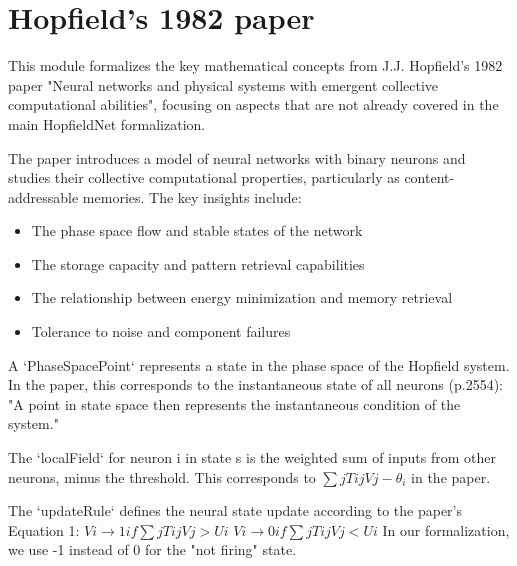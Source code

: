 \chapter{Hopfield's 1982 paper}

This module formalizes the key mathematical concepts from J.J. Hopfield's 1982 paper \cite{hopfield1982neural}
"Neural networks and physical systems with emergent collective computational abilities",
focusing on aspects that are not already covered in the main HopfieldNet formalization.

The paper introduces a model of neural networks with binary neurons and studies their collective
computational properties, particularly as content-addressable memories. The key insights include:

\begin{itemize}
\item The phase space flow and stable states of the network
\item The storage capacity and pattern retrieval capabilities
\item The relationship between energy minimization and memory retrieval
\item Tolerance to noise and component failures
\end{itemize}

\begin{definition}\label{PhaseSpacePoint}
\leanok
A `PhaseSpacePoint` represents a state in the phase space of the Hopfield system.
In the paper, this corresponds to the instantaneous state of all neurons (p.2554):
"A point in state space then represents the instantaneous condition of the system."
\end{definition}


\begin{definition}\label{localField}
\leanok
The `localField` for neuron i in state s is the weighted sum of inputs from other neurons,
minus the threshold. This corresponds to $\sum j Tij Vj - \theta_i$ in the paper.
\end{definition}


\begin{definition}\label{updateRule}
\leanok
The `updateRule` defines the neural state update according to the paper's Equation 1:
    $Vi \rightarrow 1 if \sum j Tij Vj > Ui$
   $ Vi \rightarrow 0 if \sum j Tij Vj < Ui$
In our formalization, we use -1 instead of 0 for the "not firing" state.
\end{definition}

